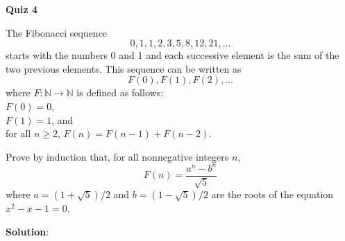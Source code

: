 \documentclass[11pt]{article}
\def\nats{{\mathbb N}}
\begin{document}
{\bf \large Quiz 4}

\begin{question}
The Fibonacci sequence
$$0,1,1,2,3,5,8,12,21, \ldots$$
starts with the numbers 0 and 1 and each successive element is the sum of the two previous elements.
This sequence can be written as
$$F(0), F(1), F(2), \ldots$$
where
$F:\nats \rightarrow \nats$ is defined
as follows:\\
$F(0) = 0$,\\
$F(1) = 1$, and\\
for all $n \geq 2$, $F(n) = F(n-1) + F(n-2)$.


Prove by induction that,  for all nonnegative integers $n$, 
$$F(n)  = \frac{a^n -b^n}{\sqrt{5}}$$
where $a = (1+\sqrt{5})/2$ and $b = (1-\sqrt{5})/2$ are the roots of the equation $x^2 - x -1 =0$.
\end{question}


\begin{solution}
{\bf Solution}:\\

\end{solution}
\end{document}
